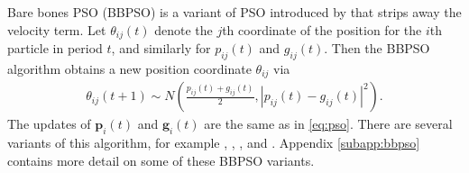 \documentclass[12pt]{article}
\begin{document}
Bare bones PSO (BBPSO) is a variant of PSO introduced by \citet{kennedy2003bare} that strips away the velocity term. Let $\theta_{ij}(t)$ denote the $j$th coordinate of the position for the $i$th particle in period $t$, and similarly for $p_{ij}(t)$ and $g_{ij}(t)$. Then the BBPSO algorithm obtains a new position coordinate $\theta_{ij}$ via
\begin{align}\label{eq:bbpso}
\theta_{ij}(t+1) \sim N\left(\frac{p_{ij}(t) + g_{ij}(t)}{2}, |p_{ij}(t) - g_{ij}(t)|^2\right).
\end{align}
The updates of $\bm{p}_i(t)$ and $\bm{g}_i(t)$ are the same as in \eqref{eq:pso}. There are several variants of this algorithm, for example \citet{krohling2009bare}, \citet{hsieh2010modified}, \citet{richer2006levy}, and \citet{campos2014bare}. Appendix \ref{subapp:bbpso} contains more detail on some of these BBPSO variants.
\end{document}
